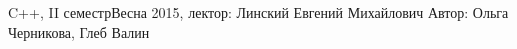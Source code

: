 


\BigHeader
	{C++, II семестр}{Весна 2015, лектор: Линский Евгений Михайлович}
	{Автор: Ольга Черникова, Глеб Валин}

 



